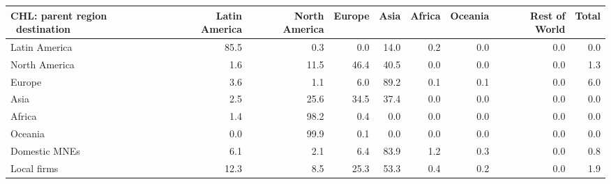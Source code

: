 \begin{tabular}{lrrrrrrrr}
\toprule
CHL: parent region \ destination & Latin America & North America & Europe & Asia & Africa & Oceania & Rest of World & Total \\
\midrule
Latin America & 85.5 & 0.3 & 0.0 & 14.0 & 0.2 & 0.0 & 0.0 & 0.0 \\
North America & 1.6 & 11.5 & 46.4 & 40.5 & 0.0 & 0.0 & 0.0 & 1.3 \\
Europe & 3.6 & 1.1 & 6.0 & 89.2 & 0.1 & 0.1 & 0.0 & 6.0 \\
Asia & 2.5 & 25.6 & 34.5 & 37.4 & 0.0 & 0.0 & 0.0 & 0.0 \\
Africa & 1.4 & 98.2 & 0.4 & 0.0 & 0.0 & 0.0 & 0.0 & 0.0 \\
Oceania & 0.0 & 99.9 & 0.1 & 0.0 & 0.0 & 0.0 & 0.0 & 0.0 \\
Domestic MNEs & 6.1 & 2.1 & 6.4 & 83.9 & 1.2 & 0.3 & 0.0 & 0.8 \\
Local firms & 12.3 & 8.5 & 25.3 & 53.3 & 0.4 & 0.2 & 0.0 & 1.9 \\
\bottomrule
\end{tabular}
